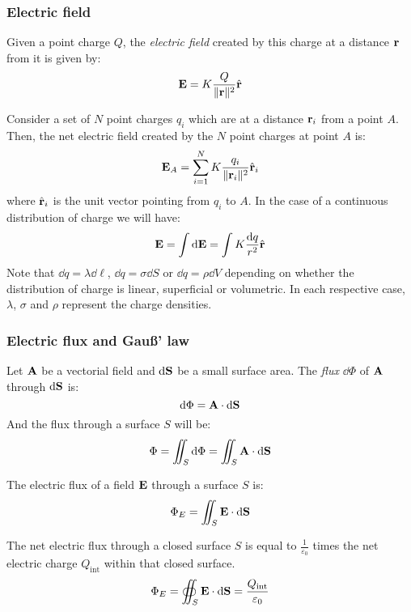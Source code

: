 \documentclass[../../../main_physics.tex]{subfiles}
\begin{document}
\begin{multicols}{2}
  \subsubsection{Electric field}
  \begin{definition}
    Given a point charge $Q$, the \emph{electric field} created by this charge at a distance $\boldsymbol{\mathrm{r}}$ from it is given by:
    $$\boldsymbol{\mathrm{E}}=K\frac{Q}{\|\boldsymbol{\mathrm{r}}\|^2}\hat{\boldsymbol{\mathrm{r}}}$$
  \end{definition}
  \begin{principle}
    Consider a set of $N$ point charges $q_i$ which are at a distance $\boldsymbol{\mathrm{r}}_i$ from a point $A$. Then, the net electric field created by the $N$ point charges at point $A$ is:
    $$\boldsymbol{\mathrm{E}}_A=\sum_{i=1}^NK\frac{q_i}{\|\boldsymbol{\mathrm{r}}_{i}\|^2}\hat{\boldsymbol{\mathrm{r}}}_{i}$$ where $\hat{\boldsymbol{\mathrm{r}}}_{i}$ is the unit vector pointing from $q_i$ to $A$. In the case of a continuous distribution of charge we will have:
    $$\boldsymbol{\mathrm{E}}=\int\dd{\boldsymbol{\mathrm{E}}}=\int K\frac{\dd{q}}{r^2}\hat{\boldsymbol{\mathrm{r}}}$$
    Note that $\dd{q}=\lambda\dd{\ell}$, $\dd{q}=\sigma\dd{S}$ or $\dd{q}=\rho\dd{V}$ depending on whether the distribution of charge is linear, superficial or volumetric. In each respective case, $\lambda$, $\sigma$ and $\rho$ represent the charge densities.
  \end{principle}
  \subsubsection{Electric flux and Gau\ss' law}
  \begin{definition}
    Let $\boldsymbol{\mathrm{A}}$ be a vectorial field and $\dd{\boldsymbol{\mathrm{S}}}$ be a small surface area. The \emph{flux} $\dd{\Phi}$ of $\boldsymbol{\mathrm{A}}$ through $\dd{\boldsymbol{\mathrm{S}}}$ is:
    $$\dd{\Phi}=\boldsymbol{\mathrm{A}}\cdot\dd{\boldsymbol{\mathrm{S}}}$$ And the flux through a surface $S$ will be:
    $$\Phi=\iint_S \dd{\Phi}=\iint_S\boldsymbol{\mathrm{A}}\cdot \dd{\boldsymbol{\mathrm{S}}}$$
  \end{definition}
  \begin{corollary}
    The electric flux of a field $\boldsymbol{\mathrm{E}}$ through a surface $S$ is:
    $$\Phi_E=\iint_S\boldsymbol{\mathrm{E}}\cdot \dd{\boldsymbol{\mathrm{S}}}$$
  \end{corollary}
  \begin{law}
    The net electric flux through a closed surface $S$ is equal to $\frac{1}{\varepsilon_0}$ times the net electric charge $Q_\text{int}$ within that closed surface.
    $$\Phi_E=\oiint_S\boldsymbol{\mathrm{E}}\cdot\dd{\boldsymbol{\mathrm{S}}}=\frac{Q_\text{int}}{\varepsilon_0}$$
  \end{law}

\end{multicols}
\end{document}
